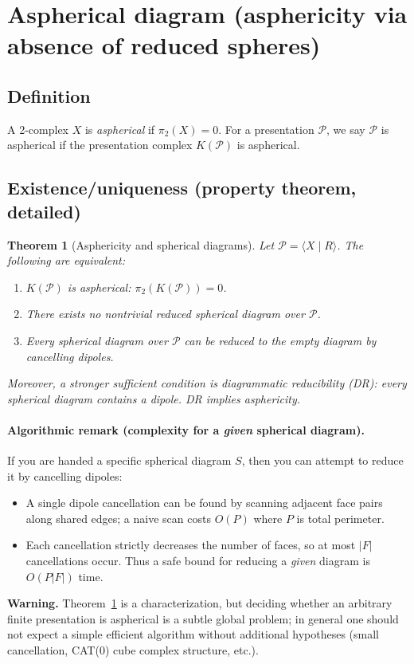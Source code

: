 \documentclass[11pt]{article}
\newtheorem{theorem}{Theorem}[section]
\theoremstyle{definition}
\theoremstyle{plain}
\theoremstyle{remark}
\begin{document}
\section{Aspherical diagram (asphericity via absence of reduced spheres)}

\subsection*{Definition}
A 2-complex $X$ is \emph{aspherical} if $\pi_2(X)=0$.
For a presentation $\mathcal P$, we say $\mathcal P$ is aspherical if the presentation complex $K(\mathcal P)$ is aspherical.

\subsection*{Existence/uniqueness (property theorem, detailed)}
\begin{theorem}[Asphericity and spherical diagrams]\label{thm:aspherical}
Let $\mathcal P=\langle X\mid R\rangle$.
The following are equivalent:
\begin{enumerate}[leftmargin=2.2em]
\item $K(\mathcal P)$ is aspherical: $\pi_2(K(\mathcal P))=0$.
\item There exists \emph{no} nontrivial reduced spherical diagram over $\mathcal P$.
\item Every spherical diagram over $\mathcal P$ can be reduced to the empty diagram by cancelling dipoles.
\end{enumerate}
Moreover, a stronger sufficient condition is \emph{diagrammatic reducibility (DR)}:
every spherical diagram contains a dipole. DR implies asphericity.
\end{theorem}


\paragraph{Algorithmic remark (complexity for a \emph{given} spherical diagram).}
If you are handed a specific spherical diagram $S$, then you can attempt to reduce it by cancelling dipoles:
\begin{itemize}[leftmargin=2em]
\item A single dipole cancellation can be found by scanning adjacent face pairs along shared edges; a naive scan costs $O(P)$ where $P$ is total perimeter.
\item Each cancellation strictly decreases the number of faces, so at most $|F|$ cancellations occur.
Thus a safe bound for reducing a \emph{given} diagram is $O(P|F|)$ time.
\end{itemize}
\textbf{Warning.} Theorem~\ref{thm:aspherical} is a characterization, but deciding whether an arbitrary finite presentation is aspherical is a subtle global problem;
in general one should not expect a simple efficient algorithm without additional hypotheses (small cancellation, CAT(0) cube complex structure, etc.).
\end{document}
